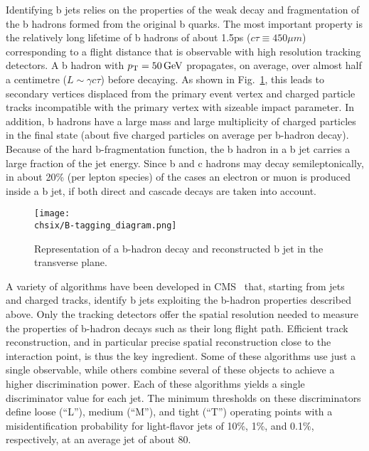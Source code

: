 Identifying b jets relies on the properties of the weak decay and fragmentation of the b hadrons formed from the original b quarks. The most important property is the relatively long lifetime of b hadrons of about 1.5\unit{ps} ($c\tau \equiv 450\mu m$) corresponding to a flight distance that is observable with high resolution tracking detectors. A b hadron with $p_{\mathrm{T}} = 50\,\text{Ge\hspace{-.08em}V}$ propagates, on average, over almost half a centimetre ($L \sim \gamma c \tau$) before decaying. As shown in Fig.~\ref{fig:bjet}, this leads to secondary vertices displaced from the primary event vertex and charged particle tracks incompatible with the primary vertex with sizeable impact parameter. In addition, b hadrons have a large mass and large multiplicity of charged particles in the final state (about five charged particles on average per b-hadron decay). Because of the hard b-fragmentation function, the b hadron in a b jet carries a large fraction of the jet energy. Since b and c hadrons may decay semileptonically, in about 20\% (per lepton species) of the cases an electron or muon is produced inside a b jet, if both direct and cascade decays are taken into account.

\begin{figure}[!htb]
 \begin{center}
  \texttt{[image: \\chsix/B-tagging\_diagram.png]}
 \end{center}
 \caption{Representation of a b-hadron decay and reconstructed b jet in the transverse plane.}
 \label{fig:bjet}
\end{figure}

A variety of algorithms have been developed in CMS~\cite{Chatrchyan:2012jua} that, starting from jets and charged tracks, identify b jets exploiting the b-hadron properties described above.
Only the tracking detectors offer the spatial resolution needed to measure the properties of b-hadron decays such as their long flight path. Efficient track reconstruction, and in particular precise spatial reconstruction close to the interaction point, is thus the key ingredient. 
Some of these algorithms use just a single observable, while others combine several of these objects to achieve a higher discrimination power. Each of these algorithms yields a single discriminator value for each jet. The minimum thresholds on these discriminators define loose (``L''), medium (``M''), and tight (``T'') operating points with a misidentification probability for light-flavor jets of 10\%, 1\%, and 0.1\%, respectively, at an average jet \pt of about 80\GeV.

